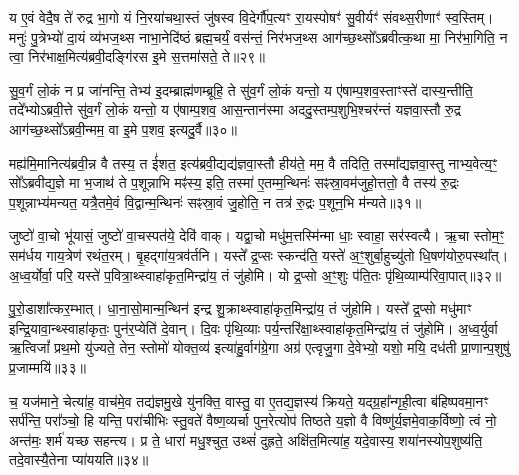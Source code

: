 य ए॒वं वेदै॒ष ते॑ रुद्र भा॒गो यं नि॒रया॑चथा॒स्तं जु॑षस्व वि॒देर्गौ॑प॒त्यꣳ रा॒यस्पोषꣳ॑ सु॒वीर्यꣳ॑ संवथ्स॒रीणाꣳ॑ स्व॒स्तिम्। मनुः॑ पु॒त्रेभ्यो॑ दा॒यं व्य॑भज॒थ्स नाभा॒नेदि॑ष्ठं ब्रह्म॒चर्यं॒ वस॑न्तं॒ निर॑भज॒थ्स आग॑च्छ॒थ्सो᳚\-ऽब्रवीत्क॒था मा॒ निर॑भा॒गिति॒ न त्वा॒ निर॑भाक्ष॒मित्य॑ब्रवी॒दङ्गि॑रस इ॒मे स॒त्तमा॑सते॒ ते॥२९॥

सु॒व॒र्गं लो॒कं न प्र जा॑नन्ति॒ तेभ्य॑ इ॒दम्ब्राह्म॑णम्ब्रूहि॒ ते सु॑व॒र्गं लो॒कं यन्तो॒ य ए॑षाम्प॒शव॒स्ताꣳस्ते॑ दास्य॒न्तीति॒ तदे᳚भ्यो\-ऽब्रवी॒त्ते सु॑व॒र्गं लो॒कं यन्तो॒ य ए॑षाम्प॒शव॒ आस॒न्तान॑स्मा अददु॒स्तम्प॒शुभि॒श्चर॑न्तं यज्ञवा॒स्तौ रु॒द्र आग॑च्छ॒थ्सो᳚\-ऽब्रवी॒न्मम॒ वा इ॒मे प॒शव॒ इत्यदु॒र्वै॥३०॥

मह्य॑मि॒मानित्य॑ब्रवी॒न्न वै तस्य॒ त ई॑शत॒ इत्य॑ब्रवी॒द्यद्य॑ज्ञवा॒स्तौ हीय॑ते॒ मम॒ वै तदिति॒ तस्मा᳚द्यज्ञवा॒स्तु नाभ्य॒वेत्य॒ꣳ॒ सो᳚\-ऽब्रवीद्य॒ज्ञे मा भ॒जाथ॑ ते प॒शून्नाभि मꣴ॑स्य॒ इति॒ तस्मा॑ ए॒तम्म॒न्थिनः॑ सꣴस्रा॒वम॑जुहो॒त्ततो॒ वै तस्य॑ रु॒द्रः प॒शून्नाभ्य॑मन्यत॒ यत्रै॒तमे॒वं वि॒द्वान्म॒न्थिनः॑ सꣴस्रा॒वं जु॒होति॒ न तत्र॑ रु॒द्रः प॒शून॒भि म॑न्यते॥३१॥

{}

जुष्टो॑ वा॒चो भू॑यासं॒ जुष्टो॑ वा॒चस्पत॑ये॒ देवि॑ वाक्। यद्वा॒चो मधु॑म॒त्तस्मि॑न्मा धाः॒ स्वाहा॒ सर॑स्वत्यै। ऋ॒चा स्तोम॒ꣳ॒ सम॑र्धय गाय॒त्रेण॑ रथंत॒रम्। बृ॒हद्गा॑य॒त्रव॑र्तनि। यस्ते᳚ द्र॒प्सः स्कन्द॑ति॒ यस्ते॑ अ॒ꣳ॒शुर्बा॒हुच्यु॑तो धि॒षण॑योरु॒पस्था᳚त्। अ॒ध्व॒र्योर्वा॒ परि॒ यस्ते॑ प॒वित्रा॒थ्स्वाहा॑कृत॒मिन्द्रा॑य॒ तं जु॑होमि। यो द्र॒प्सो अ॒ꣳ॒शुः प॑ति॒तः पृ॑थि॒व्याम्प॑रिवा॒पात्॥३२॥

पु॒रो॒डाशा᳚त्कर॒म्भात्। धा॒ना॒सो॒मान्म॒न्थिन॑ इन्द्र शु॒क्राथ्स्वाहा॑कृत॒मिन्द्रा॑य॒ तं जु॑होमि। यस्ते᳚ द्र॒प्सो मधु॑माꣳ इन्द्रि॒यावा॒न्थ्स्वाहा॑कृतः॒ पुन॑र॒प्येति॑ दे॒वान्। दि॒वः पृ॑थि॒व्याः पर्य॒न्तरि॑क्षा॒थ्स्वाहा॑कृत॒मिन्द्रा॑य॒ तं जु॑होमि। अ॒ध्व॒र्युर्वा ऋ॒त्विजां᳚ प्रथ॒मो यु॑ज्यते॒ तेन॒ स्तोमो॑ योक्त॒व्य॑ इत्या॑हु॒र्वाग॑ग्रे॒गा अग्र॑ एत्वृजु॒गा दे॒वेभ्यो॒ यशो॒ मयि॒ दध॑ती प्रा॒णान्प॒शुषु॑ प्र॒जाम्मयि॑॥३३॥

च॒ यज॑माने॒ चेत्या॑ह॒ वाच॑मे॒व तद्य॑ज्ञमु॒खे यु॑नक्ति॒ वास्तु॒ वा ए॒तद्य॒ज्ञस्य॑ क्रियते॒ यद्ग्र॒हा᳚न्गृही॒त्वा ब॑हिष्पवमा॒नꣳ सर्प॑न्ति॒ परा᳚ञ्चो॒ हि यन्ति॒ परा॑चीभिः स्तु॒वते॑ वैष्ण॒व्यर्चा पुन॒रेत्योप॑ तिष्ठते य॒ज्ञो वै विष्णु॑र्य॒ज्ञमे॒वाक॒र्विष्णो॒ त्वं नो॒ अन्त॑मः॒ शर्म॑ यच्छ सहन्त्य। प्र ते॒ धारा॑ मधु॒श्चुत॒ उथ्सं॑ दुह्रते॒ अक्षि॑त॒मित्या॑ह॒ यदे॒वास्य॒ शया॑नस्योप॒शुष्य॑ति॒ तदे॒वास्यै॒तेना प्या॑ययति॥३४॥


